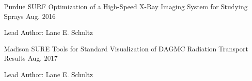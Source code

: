 \begin{cventries}
  \cventry
    {Purdue SURF}
    {Optimization of a High-Speed X-Ray Imaging System for Studying Sprays}
    {}
    {Aug. 2016}
    {
      \begin{cvitems}
        \item {Lead Author: Lane E. Schultz}
      \end{cvitems}
    }
  \cventry
    {Madison SURE}
    {Tools for Standard Visualization of DAGMC Radiation Transport Results}
    {}
    {Aug. 2017}
    {
      \begin{cvitems}
        \item {Lead Author: Lane E. Schultz}
      \end{cvitems}
    }
\end{cventries}
